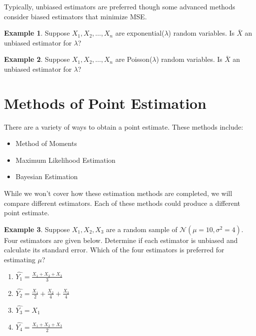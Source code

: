 \documentclass[
  11pt,
  oneside]{book}
\theoremstyle{definition}
\theoremstyle{definition}
\newtheorem{example}{Example}[chapter]
\theoremstyle{definition}
\theoremstyle{definition}
\theoremstyle{remark}
\begin{document}
Typically, unbiased estimators are preferred though some advanced methods consider biased estimators that minimize MSE.

\begin{example}
Suppose \(X_1, X_2, \ldots, X_n\) are exponential(\(\lambda\)) random variables. Is \(\bar{X}\) an unbiased estimator for \(\lambda\)?
\end{example}

\vfill \vfill

\begin{example}
Suppose \(X_1, X_2, \ldots, X_n\) are Poisson(\(\lambda\)) random variables. Is \(\bar{X}\) an unbiased estimator for \(\lambda\)?
\end{example}

\vfill \vfill

\newpage

\section{Methods of Point Estimation}\label{methods-of-point-estimation}

There are a variety of ways to obtain a point estimate. These methods include:

\begin{itemize}
\item
  Method of Moments
\item
  Maximum Likelihood Estimation
\item
  Bayesian Estimation
\end{itemize}

While we won't cover how these estimation methods are completed, we will compare different estimators. Each of these methods could produce a different point estimate.

\begin{example}
Suppose \(X_1, X_2, X_3\) are a random sample of \(\mathcal{N}(\mu=10,\sigma^2=4)\). Four estimators are given below. Determine if each estimator is unbiased and calculate its standard error. Which of the four estimators is preferred for estimating \(\mu\)?
\end{example}

\begin{enumerate}
\def\labelenumi{(\alph{enumi})}
\item
  \(\hat{Y_1} = \frac{X_1 + X_2 + X_3}{3}\) \vfill
\item
  \(\hat{Y_2} = \frac{X_1}{2}+\frac{X_2}{4}+\frac{X_3}{4}\) \vfill
\item
  \(\hat{Y_3} = X_1\) \vfill
\item
  \(\hat{Y_4} = \frac{X_1+X_2+X_3}{2}\) \vfill
\end{enumerate}
\end{document}
